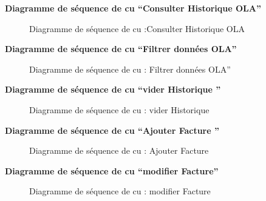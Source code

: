 \documentclass[a4paper,11pt]{report}
\begin{document}
\newpage
\textbf{ Diagramme de séquence de cu “Consulter Historique OLA”}

\begin{figure}[H]
  \centering
  \setlength{\fboxrule}{1pt}
  \setlength{\fboxsep}{3pt}
  \caption{ Diagramme de séquence de cu :Consulter Historique OLA
 }
  \label{fig:clone-result}
\end{figure}


\newpage
\textbf{ Diagramme de séquence de cu “Filtrer données OLA”}

\begin{figure}[H]
  \centering
  \setlength{\fboxrule}{1pt}
  \setlength{\fboxsep}{3pt}
  \caption{ Diagramme de séquence de cu : Filtrer données OLA”
 }
  \label{fig:clone-result}
\end{figure}

\newpage
\textbf{ Diagramme de séquence de cu “vider Historique ”}

\begin{figure}[H]
  \centering
  \setlength{\fboxrule}{1pt}
  \setlength{\fboxsep}{3pt}
  \caption{ Diagramme de séquence de cu : vider Historique 
 }
  \label{fig:clone-result}
\end{figure}

\newpage
\textbf{ Diagramme de séquence de cu “Ajouter Facture  ”}

\begin{figure}[H]
  \centering
  \setlength{\fboxrule}{1pt}
  \setlength{\fboxsep}{3pt}
  \caption{ Diagramme de séquence de cu : Ajouter Facture 
 }
  \label{fig:clone-result}
\end{figure}
\newpage
\textbf{ Diagramme de séquence de cu “modifier Facture”}

\begin{figure}[H]
  \centering
  \setlength{\fboxrule}{1pt}
  \setlength{\fboxsep}{3pt}
  \caption{ Diagramme de séquence de cu : modifier Facture
 }
  \label{fig:clone-result}
\end{figure}
\end{document}
